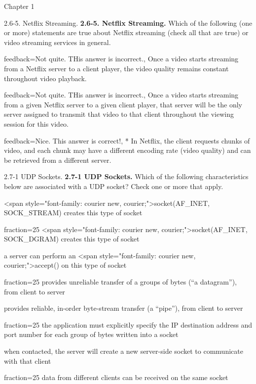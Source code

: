 \documentclass[a4paper]{article}
\begin{document}
\begin{quiz}{Chapter 1}
\begin{multi}[points=1,shuffle,multiple]{2.6-5. Netflix Streaming.}
\textbf{2.6-5. Netflix Streaming.}  Which of the following (one or more) statements are true about Netflix streaming (check all that are true) or video streaming services in general.
\item[feedback={Not quite.  THis answer is incorrect.},] Once a video starts streaming from a Netflix server to a client player, the video quality remains constant throughout video playback.
\item[feedback={Not quite.  THis answer is incorrect.},] Once a video starts streaming from a given Netflix server to a given client player, that server will be the only server assigned to transmit that video to that client throughout the viewing session for this video.
\item[feedback={Nice.  This answer is correct!},]* In Netflix, the client requests chunks of video, and each chunk may have a different encoding rate (video quality) and can be retrieved from a different server.
\end{multi}

\begin{multi}[points=1,shuffle,multiple]{2.7-1 UDP Sockets.}
\textbf{2.7-1 UDP Sockets.} Which of the following characteristics below are associated with a UDP socket? Check one or more that apply. 
\item <span style="font-family: courier new, courier;">socket(AF_INET, SOCK_STREAM) creates this type of socket
\item[fraction=25] <span style="font-family: courier new, courier;">socket(AF_INET, SOCK_DGRAM) creates this type of socket
\item a server can perform an <span style="font-family: courier new, courier;">accept() on this type of socket
\item[fraction=25] provides unreliable transfer of a groups of bytes (“a datagram”), from client to server
\item provides reliable, in-order byte-stream transfer (a “pipe”), from client to server
\item[fraction=25] the application must explicitly specify the IP destination address and port number for each group of bytes written into a socket
\item when contacted, the server will create a new server-side socket to communicate with that client
\item[fraction=25] data from different clients can be received on the same socket
\end{multi}


\end{quiz}
\end{document}

